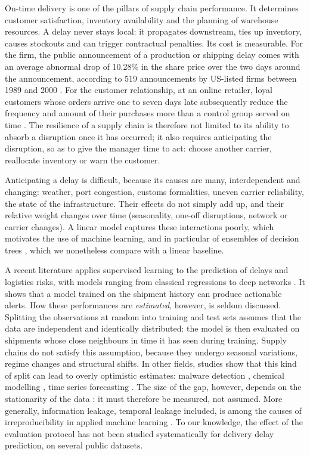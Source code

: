 \documentclass[11pt,a4paper]{article}
\theoremstyle{definition}
\begin{document}
On-time delivery is one of the pillars of supply chain performance. It determines customer satisfaction, inventory availability and the planning of warehouse resources. A delay never stays local: it propagates downstream, ties up inventory, causes stockouts and can trigger contractual penalties. Its cost is measurable. For the firm, the public announcement of a production or shipping delay comes with an average abnormal drop of 10.28\% in the share price over the two days around the announcement, according to 519 announcements by US-listed firms between 1989 and 2000 \cite{hendricks2003effect}. For the customer relationship, at an online retailer, loyal customers whose orders arrive one to seven days late subsequently reduce the frequency and amount of their purchases more than a control group served on time \cite{rao2011failure}. The resilience of a supply chain is therefore not limited to its ability to absorb a disruption once it has occurred; it also requires anticipating the disruption, so as to give the manager time to act: choose another carrier, reallocate inventory or warn the customer.

Anticipating a delay is difficult, because its causes are many, interdependent and changing: weather, port congestion, customs formalities, uneven carrier reliability, the state of the infrastructure. Their effects do not simply add up, and their relative weight changes over time (seasonality, one-off disruptions, network or carrier changes). A linear model captures these interactions poorly, which motivates the use of machine learning, and in particular of ensembles of decision trees \cite{breiman2001random,friedman2001greedy,chen2016xgboost}, which we nonetheless compare with a linear baseline.

A recent literature applies supervised learning to the prediction of delays and logistics risks, with models ranging from classical regressions to deep networks \cite{rezki2024machine,douaioui2024deep,zogaan2025leveraging,widayanti2026predicting}. It shows that a model trained on the shipment history can produce actionable alerts. How these performances are \emph{estimated}, however, is seldom discussed. Splitting the observations at random into training and test sets assumes that the data are independent and identically distributed: the model is then evaluated on shipments whose close neighbours in time it has seen during training. Supply chains do not satisfy this assumption, because they undergo seasonal variations, regime changes and structural shifts. In other fields, studies show that this kind of split can lead to overly optimistic estimates: malware detection \cite{pendlebury2019tesseract}, chemical modelling \cite{sheridan2013time}, time series forecasting \cite{cerqueira2020evaluating,hewamalage2023forecast}. The size of the gap, however, depends on the stationarity of the data \cite{cerqueira2020evaluating}: it must therefore be measured, not assumed. More generally, information leakage, temporal leakage included, is among the causes of irreproducibility in applied machine learning \cite{kapoor2023leakage,kaufman2012leakage}. To our knowledge, the effect of the evaluation protocol has not been studied systematically for delivery delay prediction, on several public datasets.
\end{document}
